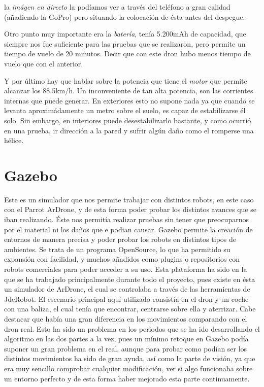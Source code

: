 \hspace{1 cm} la \textsl{im\'agen en directo} la pod\'iamos ver a trav\'es del tel\'efono a gran calidad (añadiendo la GoPro) pero situando la colocaci\'on de \'esta antes del despegue.

\hspace{1 cm} Otro punto muy importante era la \textsl{bater\'ia}, ten\'ia  5.200mAh de capacidad, que siempre nos fue suficiente para las pruebas que se realizaron, pero permite un tiempo de vuelo de 20 minutos. Decir que con este dron hubo menos tiempo de vuelo que con el anterior.

\hspace{1 cm} Y por \'ultimo hay que hablar sobre la potencia que tiene el \textsl{motor} que permite alcanzar los 88.5km/h. Un inconveniente de tan alta potencia, son las corrientes internas que puede generar. En exteriores esto no supone nada ya que cuando se levanta aproxim\'adamente un metro sobre el suelo, es capaz de estabilizarse \'el solo. Sin embargo, en interiores puede desestabilizarlo bastante, y como ocurri\'o en una prueba, ir direcci\'on a la pared y sufrir alg\'un daño como el romperse una h\'elice.

\section{Gazebo }
\hspace{1 cm} Este es un simulador que nos permite trabajar con distintos robots, en este caso con el Parrot ArDrone, y de esta forma poder probar los distintos avances que se iban realizando. \'Este nos permit\'ia realizar pruebas sin tener que preocuparnos por el material ni los daños que e podian causar. Gazebo permite la creaci\'on de entornos de manera precisa y poder probar los robots en distintos tipos de ambientes. Se trata de un programa OpenSource, lo que ha permitido su expansi\'on con facilidad, y muchos añadidos como plugins o repositorios con robots comerciales para poder acceder a su uso. Esta plataforma ha sido en la que se ha trabajado principalmente durante todo el proyecto, pues existe en \'esta un simulador de ArDrone, el cual se controlaba a trav\'es de las herramientas de JdeRobot. El escenario principal aqu\'i utilizado consist\'ia en el dron y un coche con una baliza, el cual ten\'ia que encontrar, centrarse sobre ella y aterrizar. Cabe destacar que hab\'ia una gran diferencia en los movimientos comparando con el dron real. Esto ha sido un problema en los periodos que se ha ido desarrollando el algoritmo en las dos partes a la vez, pues un m\'inimo retoque en Gazebo pod\'ia suponer un gran problema en el real, aunque para probar como pod\'ian ser los distintos movimientos ha sido de gran ayuda, as\'i como la parte de visi\'on, ya que era muy sencillo comprobar cualquier modificaci\'on, ver si algo funcionaba sobre un entorno perfecto y de esta forma haber mejorado esta parte continuamente.


